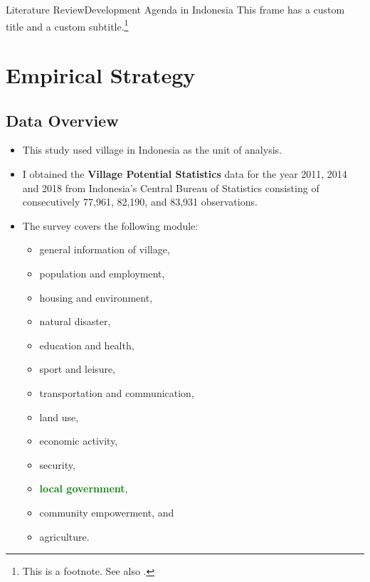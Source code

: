 \documentclass[
11pt,notheorems,hyperref={pdfauthor=Maghfira Ramadhani}
]{beamer}
\newcommand{\al}[1]{\textbf{\alert{#1}}}
\newcommand{\alg}[1]{\textbf{\textcolor{green}{#1}}}
\begin{document}
\begin{frame}{Literature Review}{Development Agenda in Indonesia}
    This frame has a custom title and a custom subtitle.\footnote{This is a footnote. See also \textcite{hartojo_2022}. }
\end{frame}

\section{Empirical Strategy}
\subsection{Data Overview}
\begin{frame}
    \begin{itemize}
        \item This study used village in Indonesia as the unit of analysis. 
        \item I obtained the \al{Village Potential Statistics} data for the year 2011, 2014 and 2018 from Indonesia's Central Bureau of Statistics consisting of consecutively 77,961, 82,190, and 83,931 observations.
        \item The survey covers the following module:
        \begin{multicols}{2}
        \begin{itemize}
            \item general information of village,
            \item population and employment, 
            \item housing and environment, 
            \item natural disaster, 
            \item education and health, 
            \item sport and leisure, 
            \item transportation and communication,
            \item land use,
            \item economic activity, 
            \item security, 
            \item \alg{local government}, 
            \item community empowerment, and \item agriculture.
        \end{itemize}
        \end{multicols}
\end{itemize}
\end{frame}
\end{document}
